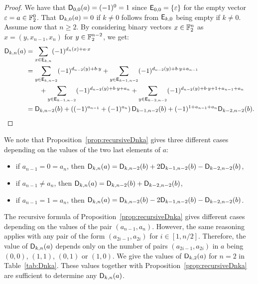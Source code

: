 \documentclass{llncs}
\begin{document}
\begin{proof}
    We have that $\Dnka 00a=(-1)^0=1$ since $\Ekn 00=\{\varepsilon\}$ for the empty vector $\varepsilon=a\in\F_2^0$. That $\Dnka 0ka=0$ if $k\neq 0$ follows from $\Ekn k0$ being empty if $k\neq 0$. Assume now that $n\geq 2$. By considering binary vectors $x\in\F_2^n$ as $x=(y,x_{n-1},x_n)$ for $y\in\F_2^{n-2}$, we get:
    \begin{align*}
		\Dnka{n}{k}{a}&=\sum_{x\in \Ekn{k}{n}} (-1)^{d_n(x) +a\cdot x}\\
		&=\sum_{y\in \Ekn{k}{n-2}} (-1)^{d_{n-2}(y) +b\cdot y}+
		\sum_{y\in \Ekn{k-1}{n-2}} (-1)^{d_{n-2}(y) +b\cdot y + a_{n-1}}\\
		&\qquad+\sum_{y\in \Ekn{k-1}{n-2}} (-1)^{d_{n-2}(y) +b\cdot y + a_{n}}
		+\sum_{y\in \Ekn{k-2}{n-2}} (-1)^{d_{n-2}(y) +b\cdot y +1 + a_{n-1}+ a_{n}}\\
		&=\Dnka{n-2}{k}{b}+\left((-1)^{a_{n-1}} + (-1)^{a_{n}}\right)\Dnka{n-2}{k-1}{b} + (-1)^{1+a_{n-1}+a_n} \Dnka{n-2}{k-2}{b}.\qedhere
    \end{align*}
\end{proof}

\begin{remark}
    We note that Proposition~\ref{prop:recursiveDnka} gives three different cases depending on the values of the two last elements of $a$:%
	\begin{itemize}
		\item if $a_{n-1}=0=a_n$, then $\Dnka{n}{k}{a}=\Dnka{n-2}{k}{b}+2\Dnka{n-2}{k-1}{b}-\Dnka{n-2}{k-2}{b}$,
		\item if $a_{n-1} \ne a_n$, then $\Dnka{n}{k}{a}=\Dnka{n-2}{k}{b}+\Dnka{n-2}{k-2}{b}$,
		\item if $a_{n-1}=1=a_n$, then $\Dnka{n}{k}{a}=\Dnka{n-2}{k}{b}-2\Dnka{n-2}{k-1}{b}-\Dnka{n-2}{k-2}{b}$.
	\end{itemize}
\end{remark}

\begin{remark}\label{rmk:dependence_dnka}
    The recursive formula of Proposition~\ref{prop:recursiveDnka} gives different cases depending on the values of the pair $(a_{n-1},a_n)$. However, the same reasoning applies with any pair of the form $(a_{2i-1}, a_{2i})$ for $i\in[1,n/2]$. Therefore, the value of $\Dnka{n}{k}{a}$ depends only on the number of pairs $(a_{2i-1}, a_{2i})$ in $a$ being $(0,0)$, $(1,1)$, $(0,1)$ or $(1,0)$. We give the values of $\Dnka{2}{k}{a}$ for $n=2$ in Table~\ref{tab:Dnka}. These values together with Proposition~\ref{prop:recursiveDnka} are sufficient to determine any $\Dnka{n}{k}{a}$.
\end{remark}
\end{document}
